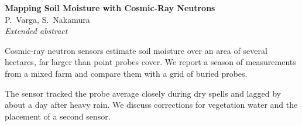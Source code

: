 \documentclass[11pt]{article}
\begin{document}
\begin{center}
  {\Large\bfseries Mapping Soil Moisture with Cosmic-Ray Neutrons}\\[1em]
  P.~Varga, S.~Nakamura\\[0.3em]
  \emph{Extended abstract}
\end{center}

\bigskip
Cosmic-ray neutron sensors estimate soil moisture over an area of several
hectares, far larger than point probes cover. We report a season of
measurements from a mixed farm and compare them with a grid of buried probes.

The sensor tracked the probe average closely during dry spells and lagged by
about a day after heavy rain. We discuss corrections for vegetation water and
the placement of a second sensor.
\end{document}
